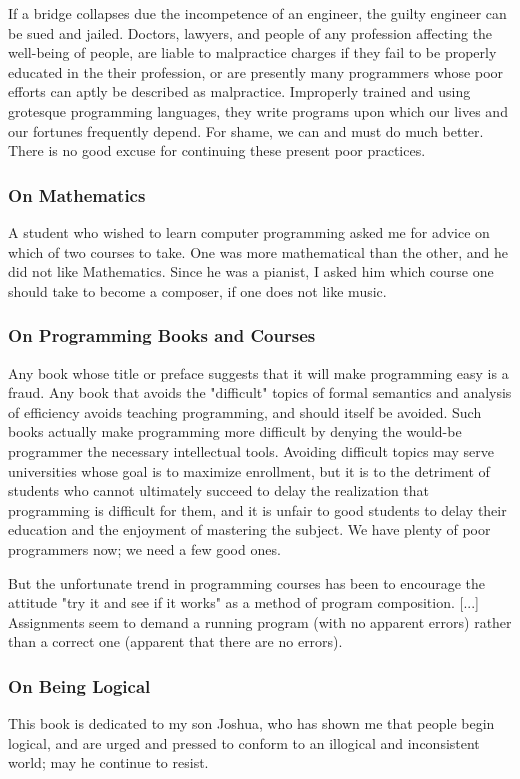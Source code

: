 \documentclass[12pt]{article}
\begin{document}
If a bridge collapses due the incompetence of an engineer, the
guilty engineer can be sued and jailed.  Doctors, lawyers, and people
of any profession affecting the well-being of people, are liable to
malpractice charges if they fail to be properly educated in the their
profession, or are presently many programmers whose poor efforts can
aptly be described as malpractice.  Improperly trained and using
grotesque programming languages, they write programs upon which our
lives and our fortunes frequently depend.  For shame, we can and must
do much better.  There is no good excuse for continuing these present
poor practices.


\subsubsection*{On Mathematics}

A student who wished to learn computer programming asked me 
for advice on which of two courses to take.  One was more mathematical
than the other, and he did not like Mathematics.  Since he was a pianist,
I asked him which course one should take to become a composer, if one 
does not like music.

\subsubsection*{On Programming Books and Courses}

Any book whose title or preface suggests that it will make 
programming easy is a fraud.  Any book that avoids the "difficult"
topics of formal semantics and analysis of efficiency avoids teaching
programming, and should itself be avoided.  Such books actually make 
programming more difficult by denying the would-be programmer the 
necessary intellectual tools.  Avoiding difficult topics may serve 
universities whose goal is to maximize enrollment, but it is to the
detriment of students who cannot ultimately succeed to delay the 
realization that programming is difficult for them, and it is unfair
to good students to delay their education and the enjoyment of mastering
the subject.  We have plenty of poor programmers now; we need a few good
ones.

	But the unfortunate trend in programming courses has been to 
encourage the attitude "try it and see if it works" as a method of 
program composition.  [...] Assignments seem to demand a running program
(with no apparent errors) rather than a correct one (apparent that there
are no errors).

\subsubsection*{On Being Logical}

This book is dedicated to my son Joshua, who has shown me that people
begin logical, and are urged and pressed to conform to an illogical and
inconsistent world; may he continue to resist.
\end{document}
